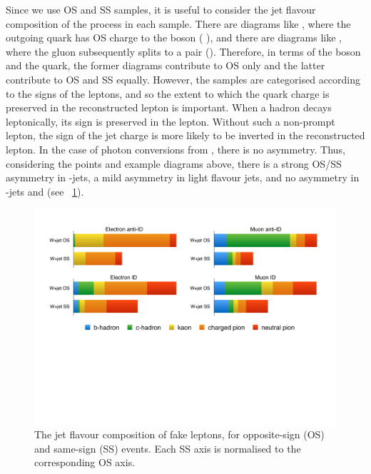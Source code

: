 Since we use OS and SS samples, it is useful to consider the jet flavour composition of 
the \Wjets process in each sample. There are diagrams like , where the outgoing quark has OS charge to the \PW boson (\eg 
\HepProcess{\PW + \Pcharm}), and there are diagrams like , where the gluon subsequently splits to a \HepProcess{\Pquark\APquark} 
pair (\eg \HepProcess{\PW + \Pbottom\APbottom}). Therefore, in terms of the \PW boson and 
the quark, the former diagrams contribute to OS only and the latter contribute to OS and 
SS equally. However, the samples are categorised according to the signs of the leptons, 
and so the extent to which the quark charge is preserved in the reconstructed lepton is 
important. When a hadron decays leptonically, its sign is preserved in the lepton. 
Without such a non-prompt lepton, the sign of the jet charge is more likely to be inverted in 
the reconstructed lepton. In the case of photon conversions from \HepProcess{\Ppizero 
\HepTo \Pphoton\Pphoton}, there is no asymmetry. Thus, considering the points and example 
diagrams above, there is a strong OS/SS asymmetry in \Pcharm-jets, a mild asymmetry in 
light flavour jets, and no asymmetry in \Pbottom-jets and \HepProcess{\Ppizero \HepTo 
\Pphoton\Pphoton} (see \Figure~\ref{fig:wjets:flav_comp}).

\begin{figure}[t]
	\includegraphics[width=\hugefigwidth,clip=true,trim=1.8cm 12cm 2cm 2cm]{custom_images/wjets/wjets_flavcomp}
	\caption{The jet flavour composition of fake leptons, for opposite-sign (OS) and 
	same-sign (SS) \Wjets events. Each SS axis is normalised to the corresponding OS 
	axis.}
	\label{fig:wjets:flav_comp}
\end{figure}

